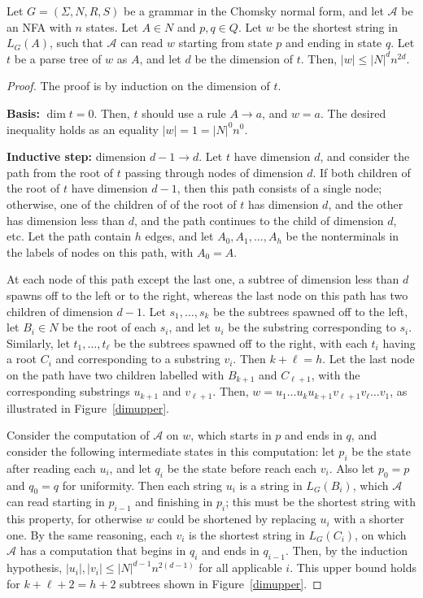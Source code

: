 \documentclass[runningheads]{llncs}
\begin{document}
\begin{lemma}\label{dimlemma}
Let $G = (\Sigma, N, R, S)$ be a grammar in the Chomsky normal form,
and let $\mathcal{A}$ be an NFA with $n$ states.
Let $A \in N$ and $p, q \in Q$.
Let $w$ be the shortest string in $L_G(A)$,
such that $\mathcal{A}$ can read $w$ starting from state $p$
and ending in state $q$.
Let $t$ be a parse tree of $w$ as $A$,
and let $d$ be the dimension of $t$.
Then, $|w| \leqslant |N|^d n^{2d}$.
\end{lemma}
\begin{proof}
The proof is by induction on the dimension of $t$.

\textbf{Basis:} $\dim t=0$.
Then, $t$ should use a rule $A \to a$, and $w=a$.
The desired inequality holds as an equality $|w| = 1 = |N|^0 n^0$.

\textbf{Inductive step:} dimension $d-1 \to d$.
Let $t$ have dimension $d$,
and consider the path from the root of $t$ passing through nodes of dimension $d$.
If both children of the root of $t$ have dimension $d-1$,
then this path consists of a single node;
otherwise, one of the children of of the root of $t$ has dimension $d$,
and the other has dimension less than $d$,
and the path continues to the child of dimension $d$, etc.
Let the path contain $h$ edges,
and let $A_0, A_1, \ldots, A_h$ be the nonterminals in the labels of nodes on this path,
with $A_0=A$.

At each node of this path except the last one,
a subtree of dimension less than $d$
spawns off to the left or to the right,
whereas the last node on this path has two children of dimension $d-1$.
Let $s_1, \ldots, s_k$ be the subtrees spawned off to the left,
let $B_i \in N$ be the root of each $s_i$,
and let $u_i$ be the substring corresponding to $s_i$.
Similarly, let $t_1, \ldots, t_\ell$ be the subtrees spawned off to the right,
with each $t_i$ having a root $C_i$ and corresponding to a substring $v_i$.
Then $k+\ell=h$.
Let the last node on the path have two children labelled with $B_{k+1}$ and $C_{\ell+1}$,
with the corresponding substrings $u_{k+1}$ and $v_{\ell+1}$.
Then, $w = u_1 \ldots u_k u_{k+1} v_{\ell+1} v_\ell \ldots v_1$,
as illustrated in Figure~\ref{dimupper}.

Consider the computation of $\mathcal{A}$ on $w$,
which starts in $p$ and ends in $q$,
and consider the following intermediate states in this computation:
let $p_i$ be the state after reading each $u_i$,
and let $q_i$ be the state before reach each $v_i$.
Also let $p_0=p$ and $q_0=q$ for uniformity.
Then each string $u_i$ is a string in $L_G(B_i)$,
which $\mathcal{A}$ can read starting in $p_{i-1}$ and finishing in $p_i$;
this must be the shortest string with this property,
for otherwise $w$ could be shortened by replacing $u_i$ with a shorter one.
By the same reasoning, each $v_i$ is the shortest string in $L_G(C_i)$,
on which $\mathcal{A}$ has a computation that begins in $q_i$ and ends in $q_{i-1}$.
Then, by the induction hypothesis,
$|u_i|,|v_i| \leqslant |N|^{d-1}n^{2(d-1)}$ for all applicable $i$.
This upper bound holds for $k+\ell+2=h+2$ subtrees
shown in Figure~\ref{dimupper}.
 

\end{proof}
\end{document}
